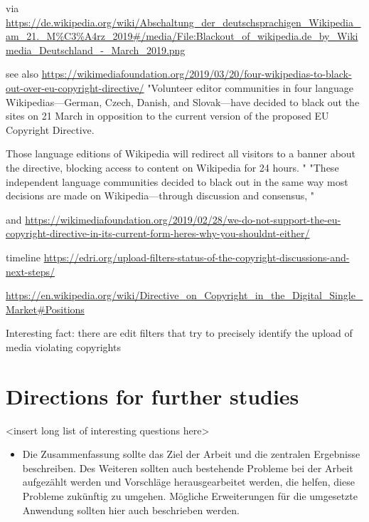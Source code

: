 via
\url{https://de.wikipedia.org/wiki/Abschaltung_der_deutschsprachigen_Wikipedia_am_21._M%C3%A4rz_2019#/media/File:Blackout_of_wikipedia.de_by_Wikimedia_Deutschland_-_March_2019.png}

see also
\url{https://wikimediafoundation.org/2019/03/20/four-wikipedias-to-black-out-over-eu-copyright-directive/}
"Volunteer editor communities in four language Wikipedias—German, Czech, Danish, and Slovak—have decided to black out the sites on 21 March in opposition to the current version of the proposed EU Copyright Directive.

Those language editions of Wikipedia will redirect all visitors to a banner about the directive, blocking access to content on Wikipedia for 24 hours. "
"These independent language communities decided to black out in the same way most decisions are made on Wikipedia—through discussion and consensus, "

and
\url{https://wikimediafoundation.org/2019/02/28/we-do-not-support-the-eu-copyright-directive-in-its-current-form-heres-why-you-shouldnt-either/}

timeline
\url{https://edri.org/upload-filters-status-of-the-copyright-discussions-and-next-steps/}

\url{https://en.wikipedia.org/wiki/Directive_on_Copyright_in_the_Digital_Single_Market#Positions}

Interesting fact: there are edit filters that try to precisely identify the upload of media violating copyrights


\section{Directions for further studies}
<insert long list of interesting questions here>

\begin{itemize}
	\item Die Zusammenfassung sollte das Ziel der Arbeit und die zentralen Ergebnisse beschreiben. Des Weiteren sollten auch bestehende Probleme bei der Arbeit aufgezählt werden und Vorschläge herausgearbeitet werden, die helfen, diese Probleme zukünftig zu umgehen. Mögliche Erweiterungen für die umgesetzte Anwendung sollten hier auch beschrieben werden.
\end{itemize}
